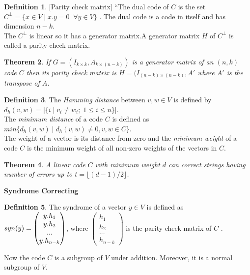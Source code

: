 \documentclass[11pt]{amsart}
\theoremstyle{plain}
\newtheorem{theorem}{Theorem}[section]
\theoremstyle{definition}
\newtheorem{definition}[theorem]{Definition}
\numberwithin{equation}{section}
\begin{document}
\vspace{5mm}

\begin{definition} \cite{error_correct} [Parity check matrix]
  ``The dual code of \(C\) is the set \(C^{\perp}=\{x \in V \;| \; x.y=0 \;\; \forall y \in V \}\) \cite{error_correct}. The dual code is a code in itself and has dimension \(n-k\).\\
  The \(C^{\perp}\) is linear so it has a generator matrix.A generator matrix \(H\) of \(C^{\perp}\) is called a parity check matrix.
\end{definition}
\vspace{5mm}

\begin{theorem} \cite{coding}
  If \(G=(I_{k \times k},A_{k \times (n-k)})\) is a generator matrix of an \((n,k)\) code \(C\) then its parity check matrix is \(H=(I_{(n-k) \times (n-k)}, A'\) where \(A'\) is the transpose of \(A\).
\end{theorem}
\vspace{5mm}

\begin{definition} \cite{error_correct}
  The \textit{Hamming distance} between \(v,w \in V\) is defined by \(d_h(v,w)=|\{i\;|\; v_i \neq w_i;\; 1 \leq i \leq n \}|\).\\
  The \textit{minimum distance} of a code \(C\) is defined as \(min\{d_h(v,w)\;|\; d_h(v,w) \neq 0, v,w \in C\}\).\\
  The weight of a vector is its distance from zero and the \textit{minimum weight} of a code \(C\) is the minimum weight of all non-zero weights of the vectors in \(C\).
\end{definition}

\begin{theorem} \cite{error_correct}
  A linear code \(C\) with minimum weight \(d\) can correct strings having number of errors up to \(t= \lfloor (d-1)/2 \rfloor\).\\
\end{theorem}
\clearpage

\textbf{Syndrome Correcting}\\
\begin{definition}
  The syndrome of a vector \(y \in V\) is defined as \\ \(syn(y)=\begin{pmatrix} \small
    y.h_1\\
    y.h_2\\
    ...\\
    y.h_{n-k}
  \end{pmatrix}\), \hspace{12mm} where \(\begin{pmatrix}
    h_1 \\ h_2\\ ...\\ h_{n-k}
  \end{pmatrix}\) is the parity check matrix of \(C\) \cite{error_correct}.
\end{definition}
Now the code \(C\) is a subgroup of \(V\) under addition. Moreover, it is a normal subgroup of \(V\).
\end{document}
